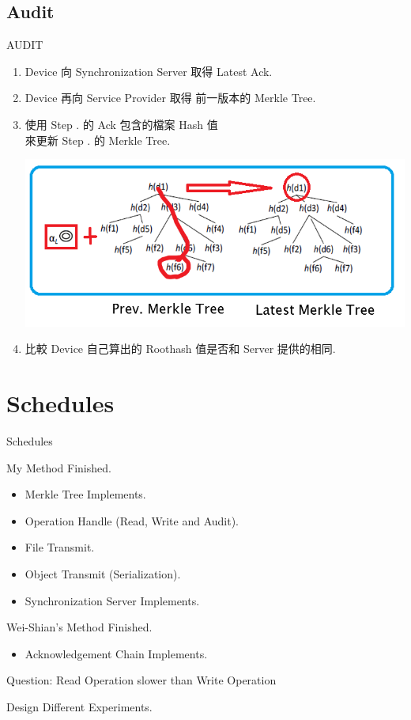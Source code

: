 \documentclass{beamer}
\newcommand{\RNum}[1]{\uppercase\expandafter{\romannumeral #1\relax}}
\begin{document}
\begin{CJK}{UTF8}{bkai}
\subsection{Audit}
\begin{frame}{AUDIT}
	\begin{enumerate}
		\item Device 向 \alert{Synchronization Server} 取得 Latest Ack.
		\item Device 再向 \alert{Service Provider} 取得 前一版本的 Merkle Tree.
		\item 使用 Step \RNum{1}. 的 Ack 包含的檔案 Hash 值\\
			  來更新 Step \RNum{2}. 的 Merkle Tree.
			  \begin{center}
			  \includegraphics[width=.7\textwidth]{auditing.png}
			  \end{center}
		\item 比較 Device 自己算出的 Roothash 值是否和 Server 提供的相同.
	\end{enumerate}
\end{frame}

\section{Schedules}
\begin{frame}{Schedules}
	\begin{enumerate}
	{\color{blue}
	\item My Method Finished.
		\begin{itemize}
			\item Merkle Tree Implements.
			\item Operation Handle (Read, Write and Audit).
			\item File Transmit.
			\item Object Transmit (Serialization).
			\item Synchronization Server Implements.
		\end{itemize}
	\item Wei-Shian's Method Finished.}
		\begin{itemize}
			\item Acknowledgement Chain Implements.
		\end{itemize}
	\item \alert{Question: Read Operation slower than Write Operation}
	\item Design Different Experiments.
	\end{enumerate}
\end{frame}


\end{CJK}
\end{document}
